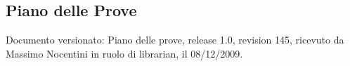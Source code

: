 \subsection{Piano delle Prove}
Documento versionato: Piano delle prove, release 1.0, revision 145, ricevuto da
Massimo Nocentini in ruolo di librarian, il 08/12/2009.